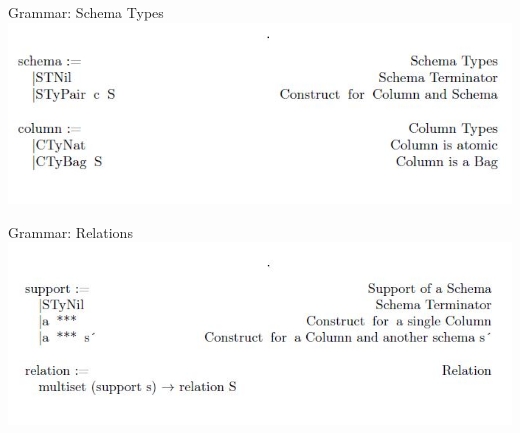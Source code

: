 \begin{frame}{Grammar: Schema Types}
\centering
%	
%
\includegraphics[scale=0.6]{Images/Grammar/Schema.JPG} 
\end{frame}


\begin{frame}{Grammar: Relations}
\centering
\includegraphics[scale=0.6]{Images/Grammar/Relation.JPG} 
\end{frame}

